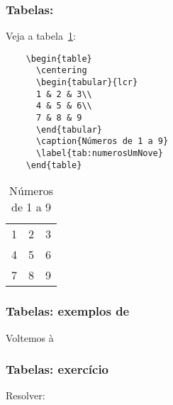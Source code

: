 \begin{frame}[fragile]
  \frametitle{Tabelas: }
  \large
  Veja a tabela~\ref{tab:numerosUmNove}:
  \vspace{1em}

  \begin{minipage}{.65\textwidth}
    \begin{verbatim}
    \begin{table}
      \centering
      \begin{tabular}{lcr}
      1 & 2 & 3\\
      4 & 5 & 6\\
      7 & 8 & 9
      \end{tabular}
      \caption{Números de 1 a 9}
      \label{tab:numerosUmNove}
    \end{table}
    \end{verbatim}
  \end{minipage}
  \hspace{.05\textwidth}
  \begin{minipage}{.25\textwidth}
    \begin{table}
      \centering
      \begin{tabular}{lcr}
        1 & 2 & 3\\
        4 & 5 & 6\\
        7 & 8 & 9
      \end{tabular}
      \caption{Números de 1 a 9}
      \label{tab:numerosUmNove}
    \end{table}
  \end{minipage}
\end{frame}

\begin{frame}
  \frametitle{Tabelas: exemplos de }
  \Huge
  Voltemos à 
\end{frame}

\begin{frame}
  \frametitle{Tabelas: exercício}
  \Huge
  Resolver: 
\end{frame}

